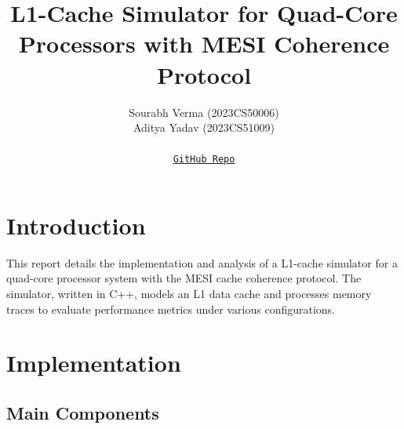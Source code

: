 \documentclass{article}
\begin{document}
\title{L1-Cache Simulator for Quad-Core Processors with MESI Coherence Protocol}
\author{
  Sourabh Verma (2023CS50006) \\
  Aditya Yadav (2023CS51009) \\
  \\
  \texttt{\href{https://github.com/golden-api/L1_cache-simulator.git}{GitHub Repo}}
}

\maketitle

\section{Introduction}

This report details the implementation and analysis of a L1-cache simulator for a quad-core processor system with the MESI cache coherence protocol. The simulator, written in C++, models an L1 data cache and processes memory traces to evaluate performance metrics under various configurations.

\section{Implementation}

\subsection{Main Components}
\end{document}
